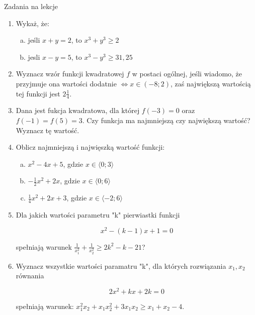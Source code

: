 \documentclass[12pt,a4paper]{article}
\begin{document}
	
	\begin{center}
		\LARGE Zadania na lekcje
	\end{center}
	\vspace{1.5cm}
	
	\begin{enumerate}[1.]
		\item Wykaż, że:
		
		\begin{enumerate}[a)]
			\item jeśli $x+y=2$, to $x^3+y^3\geq 2$
			\item jesli $x-y=5$, to $x^3-y^3\geq31,25$
		\end{enumerate}
	
	\item Wyznacz wzór funkcji kwadratowej $f$ w postaci ogólnej, jeśli wiadomo, że przyjmuje ona wartości dodatnie $\Leftrightarrow x\in (-8;2)$, zaś największą wartością tej funkcji jest $2\frac{1}{4}$.
	
	\item Dana jest fukcja kwadratowa, dla której $f(-3)=0$ oraz $f(-1)=f(5)=3$. Czy funkcja ma najmniejszą czy największą wartość? Wyznacz tę wartość.
	
	\item Oblicz najmniejszą i najwięszką wartość funkcji:
	\begin{enumerate}[a)]
		\item $x^2-4x+5$, gdzie $x\in\langle0;3\rangle$
		\item $-\frac{1}{2}x^2+2x$, gdzie $x\in\langle0;6\rangle$
		\item $\frac{1}{4}x^2+2x+3$, gdzie $x\in\langle-2;6\rangle$
	\end{enumerate} 

	\item Dla jakich wartości parametru "k" pierwiastki funkcji
	
	$$x^2-(k-1)x + 1 = 0$$ 
	
	spełniają warunek $\frac{1}{x_1^2}+\frac{1}{x_2^2}\geq 2k^2-k-21$?
	
	\item Wyznacz wszystkie wartości paramatru "k", dla których rozwiązania $x_1,x_2$ równania
	
	$$2x^2+kx+2k=0$$
	
	spełniają warunek: $x_1^2 x_2+x_1 x_2^2 + 3x_1x_2\geq x_1+x_2-4$.
		
	\end{enumerate}

	\newpage
	
\end{document}
